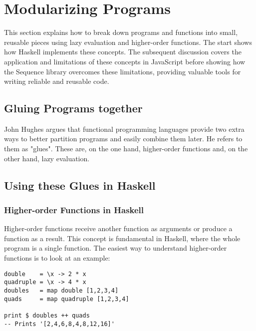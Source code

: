 \section{Modularizing Programs}
\label{sec:Modularizing Programs}
This section explains how to break down programs and functions into small,
reusable pieces using lazy evaluation and higher-order functions. The start
shows how Haskell implements these concepts. The subsequent discussion covers
the application and limitations of these concepts in JavaScript before showing
how the Sequence library overcomes these limitations, providing valuable tools
for writing reliable and reusable code.

\subsection{Gluing Programs together} %
\label{sub:Gluing Programs together}
John Hughes argues that functional programming languages provide two extra ways
to better partition programs and easily combine them later. He refers to them
as "glues". These are, on the one hand, higher-order functions and, on the
other hand, lazy evaluation. \cite[p.3]{hughes_why_1989}

\subsection{Using these Glues in Haskell} %
\label{sub:Using these Glues in Haskel}

\subsubsection{Higher-order Functions in Haskell} %
\label{subsub:Higher-order functions Haskell}
Higher-order functions receive another function as arguments or produce a
function as a result. This concept is fundamental in Haskell, where the whole
program is a single function. The easiest way to understand higher-order
functions is to look at an example:

\begin{lstlisting}[style=Haskell, 
                  caption=Higher-order functions in Haskell, 
                  label={lst:hof_haskell}
]
double    = \x -> 2 * x
quadruple = \x -> 4 * x
doubles   = map double [1,2,3,4]
quads     = map quadruple [1,2,3,4]

print $ doubles ++ quads
-- Prints '[2,4,6,8,4,8,12,16]'
\end{lstlisting}

